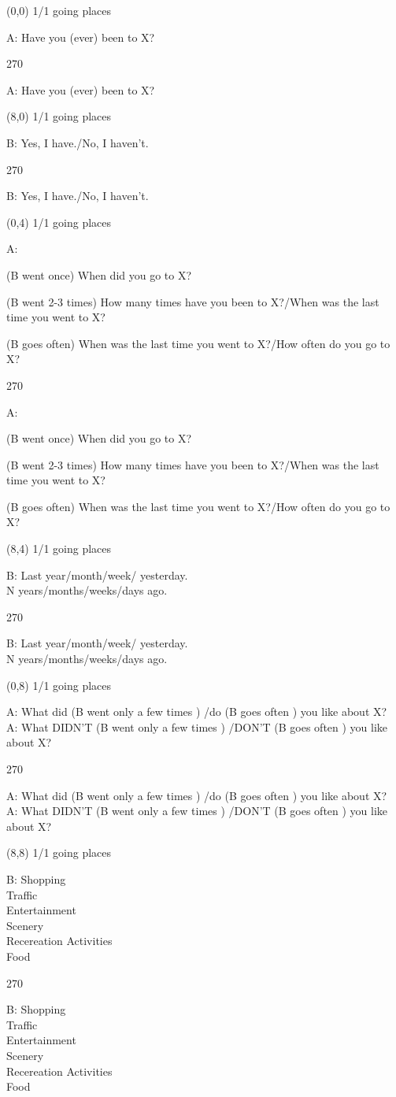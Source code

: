 \documentclass[a4paper]{article}
\newenvironment{itemize*}%
{\begin{itemize}%
 \setlength{\itemsep}{-0.5cm}%
 \setlength{\parsep}{0pt}%
 \setlength{\parskip}{0pt}}%
{\end{itemize}}
\newcommand{\mycard}[3]{%
	\small #1 #2
	\par
	\parbox[t][6.8cm][c]{9.5cm}{%
	\par
	\myleft{#3}
	\par
	\myright{#3}
	}
}
\newcommand{\myleft}[1]{%
	\begin{sideways}
	\hspace*{-0.3cm}
		\parbox[t][2.7cm][t]{6.5cm}{%
		\Large #1
		}
	\end{sideways}
}
\newcommand{\myright}[1]{%
	\hspace*{6.5cm}
	\begin{turn}{270}
	\hspace*{-6.9cm}
		\parbox[t][2.7cm][t]{6.5cm}{%
		\Large #1
		}
	\end{turn}
}
\begin{document}
\begin{textblock}{8}(0,0)
\mycard{1/1}{going places}{
A: Have you (ever) been to X?
}
\end{textblock}

\begin{textblock}{8}(8,0)
\mycard{1/1}{going places}{
B: Yes, I have./No, I haven't.
}
\end{textblock}

\begin{textblock}{8}(0,4)
\mycard{1/1}{going places}{
\vspace{-0.40cm}
A: \begin{itemize*}
\item \normalsize (B went once) \large When did you go to X?\\
\item \normalsize (B went 2-3 times) \large How many times have you been to X?/When was the last time you went to X?\\
\item \normalsize (B goes often) \large When was the last time you went to X?/How often do you go to X?\\
\end{itemize*}
}
\end{textblock}

\begin{textblock}{8}(8,4)
\mycard{1/1}{going places}{
B: Last year/month/week/ yesterday.\\
N years/months/weeks/days ago.
}
\end{textblock}

\begin{textblock}{8}(0,8)
\mycard{1/1}{going places}{
A: What did (\normalsize B went only a few times \Large) /do (\normalsize B goes often \Large) you like about X?\\
A: What DIDN'T (\normalsize B went only a few times \Large) /DON'T (\normalsize B goes often \Large) you like about X?
}
\end{textblock}

\begin{textblock}{8}(8,8)
\mycard{1/1}{going places}{
B: Shopping\\
Traffic\\
Entertainment\\
Scenery\\
Recereation Activities\\
Food\\
}
\end{textblock}
\end{document}
